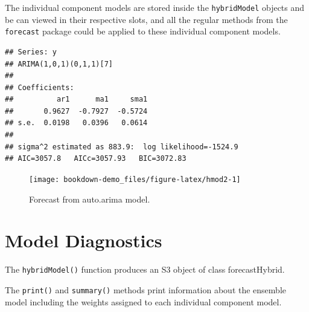 \documentclass[]{book}
\newenvironment{Shaded}{\begin{snugshade}}{\end{snugshade}}
\newcommand{\KeywordTok}[1]{\textcolor[rgb]{0.13,0.29,0.53}{\textbf{#1}}}
\newcommand{\DataTypeTok}[1]{\textcolor[rgb]{0.13,0.29,0.53}{#1}}
\newcommand{\StringTok}[1]{\textcolor[rgb]{0.31,0.60,0.02}{#1}}
\newcommand{\CommentTok}[1]{\textcolor[rgb]{0.56,0.35,0.01}{\textit{#1}}}
\newcommand{\OperatorTok}[1]{\textcolor[rgb]{0.81,0.36,0.00}{\textbf{#1}}}
\newcommand{\NormalTok}[1]{#1}
\begin{document}
The individual component models are stored inside the
\texttt{hybridModel} objects and be can viewed in their respective
slots, and all the regular methods from the \texttt{forecast} package
could be applied to these individual component models.

\begin{Shaded}
\end{Shaded}

\begin{verbatim}
## Series: y 
## ARIMA(1,0,1)(0,1,1)[7] 
## 
## Coefficients:
##          ar1      ma1     sma1
##       0.9627  -0.7927  -0.5724
## s.e.  0.0198   0.0396   0.0614
## 
## sigma^2 estimated as 883.9:  log likelihood=-1524.9
## AIC=3057.8   AICc=3057.93   BIC=3072.83
\end{verbatim}

\begin{Shaded}
\end{Shaded}

\begin{figure}

{\centering \texttt{[image: bookdown-demo\_files/figure-latex/hmod2-1]} 

}

\caption{Forecast from auto.arima model.}\label{fig:hmod2}
\end{figure}

\section{Model Diagnostics}\label{model-diagnostics}

The \texttt{hybridModel()} function produces an S3 object of class
forecastHybrid.

The \texttt{print()} and \texttt{summary()} methods print information
about the ensemble model including the weights assigned to each
individual component model.
\end{document}

